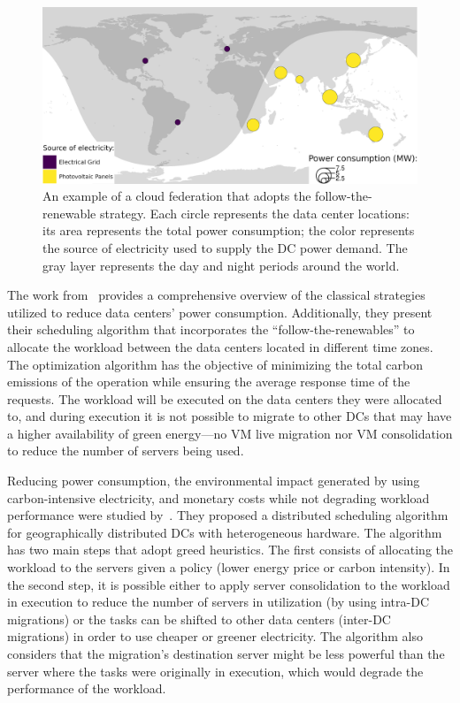 \begin{figure}[h]
\centering
  \includegraphics[width=\linewidth]{images/example_follow_the_renewables.png}
  \caption{An example of a cloud federation that adopts the follow-the-renewable strategy. Each circle represents the data center locations: its area represents the total power consumption; the color represents the source of electricity used to supply the DC power demand. The gray layer represents the day and night periods around the world. }
  \label{fig:ex_follow_the_renewables}
\end{figure}


The work from~\citet{XU2020191} provides a comprehensive overview of the classical strategies utilized to reduce data centers' power consumption. Additionally, they present their scheduling algorithm that incorporates the ``follow-the-renewables'' to allocate the workload between the data centers located in different time zones. The optimization algorithm has the objective of minimizing the total carbon emissions of the operation while ensuring the average response time of the requests. The workload will be executed on the data centers they were allocated to, and during execution it is not possible to migrate to other DCs that may have a higher availability of green energy---no VM live migration nor VM consolidation to reduce the number of servers being used.



Reducing power consumption, the environmental impact generated by using carbon-intensive electricity, and monetary costs while not degrading workload performance were studied by~\citet{ALI2021110907}. They proposed a distributed scheduling algorithm for geographically distributed DCs with heterogeneous hardware. The algorithm has two main steps that adopt greed heuristics. The first consists of allocating the workload to the servers given a policy (lower energy price or carbon intensity). In the second step, it is possible either to apply server consolidation to the workload in execution to reduce the number of servers in utilization (by using intra-DC migrations) or the tasks can be shifted to other data centers (inter-DC migrations) in order to use cheaper or greener electricity. The algorithm also considers that the migration's destination server might be less powerful than the server where the tasks were originally in execution, which would degrade the performance of the workload.

